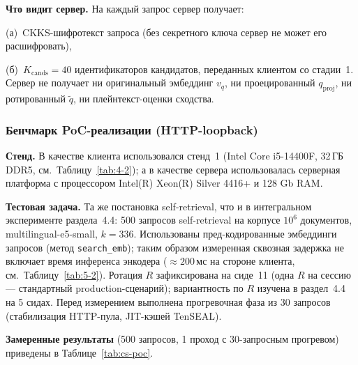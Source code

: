 \documentclass[a4paper, 12pt, oneside, openany]{article}
\begin{document}
\textbf{Что видит сервер.} На каждый запрос сервер получает:

 (а)~CKKS-шифротекст запроса (без секретного ключа сервер не может его расшифровать),
 
  (б)~$K_{\mathrm{cands}} = 40$ идентификаторов кандидатов, переданных клиентом со стадии~1. Сервер не получает ни оригинальный эмбеддинг $v_q$, ни проецированный $q_{\mathrm{proj}}$, ни ротированный $\tilde q$, ни плейнтекст-оценки сходства. 
  
\subsubsection{Бенчмарк PoC-реализации (HTTP-loopback)}

\textbf{Стенд.} В качестве клиента использовался стенд~1 (Intel Core i5-14400F, 32\,ГБ DDR5, см.\ Таблицу~\ref{tab:4-2}); а в качестве сервера использовалась серверная платформа с процессором Intel(R) Xeon(R) Silver 4416+ и 128 Gb RAM.

\textbf{Тестовая задача.} Та же постановка self-retrieval, что и в интегральном эксперименте раздела~4.4: 500 запросов self-retrieval на корпусе $10^6$ документов, multilingual-e5-small, $k = 336$. Использованы пред-кодированные эмбеддинги запросов (метод \texttt{search\_emb}); таким образом измеренная сквозная задержка не включает время инференса энкодера ($\approx 200$\,мс на стороне клиента, см.\ Таблицу~\ref{tab:5-2}). Ротация $R$ зафиксирована на сиде~11 (одна $R$ на сессию --- стандартный production-сценарий); вариантность по $R$ изучена в раздел~4.4 на 5 сидах. Перед измерением выполнена прогревочная фаза из 30 запросов (стабилизация HTTP-пула, JIT-кэшей TenSEAL).

\textbf{Замеренные результаты} (500 запросов, 1 проход с 30-запросным прогревом) приведены в Таблице~\ref{tab:cs-poc}.
\end{document}
